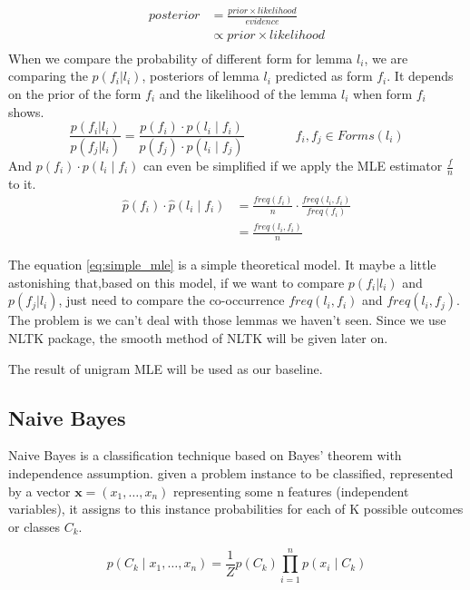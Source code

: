 \documentclass[a4paper]{article}
\begin{document}
\begin{align*}
posterior  &= \frac{prior \times likelihood}{evidence} \\
           &\propto  prior \times likelihood \\
\end{align*}
When we compare the probability of different form for lemma $l_i$, we are comparing the $p(f_i|l_i)$, posteriors  of lemma $l_i$ predicted as form $f_i$. It depends on the prior of the form $f_i$ and the likelihood of the lemma $l_i$ when form $f_i$ shows.
\begin{equation}
\frac{p(f_i|l_i)}{p(f_j|l_i)} = \frac{p(f_i) \cdot p(l_i \mid f_i)}{  p(f_j) \cdot p(l_i \mid f_j) } \qquad \qquad  f_i,f_j \in Forms(l_i)
\end{equation}
And $p(f_i) \cdot p(l_i \mid f_i)$ can even be simplified if we apply the MLE estimator $\frac{f}{n}$ to it.
\begin{equation} 
\label{eq:simple_mle}
\begin{aligned}
\hat{p}(f_i) \cdot \hat{p}(l_i \mid f_i) &= \frac{freq(f_i)}{n} \cdot \frac{freq(l_i, f_i)}{freq(f_i)} \\
&= \frac{freq(l_i, f_i)}{n}
\end{aligned}
\end{equation}

The equation \ref{eq:simple_mle} is a simple theoretical model. It maybe a little astonishing that,based on this model, if we want to compare $p(f_i|l_i)$ and $p(f_j|l_i)$, just need to compare the co-occurrence $freq(l_i,f_i)$ and $freq(l_i,f_j)$.  The problem is we can't deal with those lemmas we haven't seen. Since we use NLTK package, the smooth method of NLTK will be given later on. 

The result of unigram MLE will be used as our baseline.

\subsection{Naive Bayes}
Naive Bayes is a classification technique based on Bayes' theorem with independence assumption.  given a problem instance to be classified, represented by a vector ${\mathbf  {x}}=(x_{1},\dots ,x_{n})$ representing some n features (independent variables), it assigns to this instance probabilities for each of K possible outcomes or classes $C_{k}$. \cite{murty_pattern_2011}

\[p(C_{k}\mid x_{1},\dots ,x_{n})={\frac {1}{Z}}p(C_{k})\prod _{i=1}^{n}p(x_{i}\mid C_{k})\]
\end{document}
